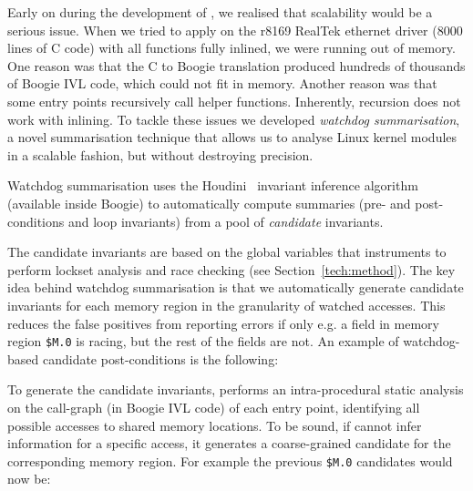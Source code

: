 Early on during the development of \whoop, we realised that scalability would be a serious issue. When we tried to apply \whoop on the r8169 RealTek ethernet driver (8000 lines of C code) with all functions fully inlined, we were running out of memory. One reason was that the C to Boogie translation produced hundreds of thousands of Boogie IVL code, which could not fit in memory. Another reason was that some entry points recursively call helper functions. Inherently, recursion does not work with inlining. To tackle these issues we developed \emph{watchdog summarisation}, a novel summarisation technique that allows us to analyse Linux kernel modules in a scalable fashion, but without destroying precision.

Watchdog summarisation uses the Houdini~\cite{flanagan2001houdini} invariant inference algorithm (available inside Boogie) to automatically compute summaries (pre- and post-conditions and loop invariants) from a pool of \emph{candidate} invariants.

The candidate invariants are based on the global variables that \whoop instruments to perform lockset analysis and race checking (see Section~\ref{tech:method}). The key idea behind watchdog summarisation is that we automatically generate candidate invariants for each memory region in the granularity of watched accesses. This reduces the false positives from reporting errors if only e.g. a field in memory region \texttt{\$M.0} is racing, but the rest of the fields are not. An example of watchdog-based candidate post-conditions is the following:


To generate the candidate invariants, \whoop performs an intra-procedural static analysis on the call-graph (in Boogie IVL code) of each entry point, identifying all possible accesses to shared memory locations. To be sound, if \whoop cannot infer information for a specific access, it generates a coarse-grained candidate for the corresponding memory region. For example the previous \texttt{\$M.0} candidates would now be:

